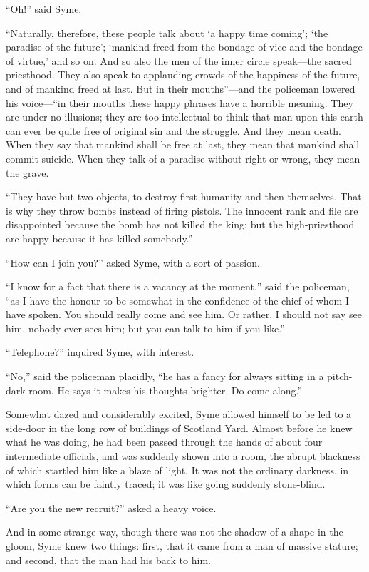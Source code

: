 “Oh!” said Syme.

“Naturally, therefore, these people talk about ‘a happy time coming’; ‘the paradise of the future’; ‘mankind freed from the bondage of vice and the bondage of virtue,’ and so on. And so also the men of the inner circle speak⁠—the sacred priesthood. They also speak to applauding crowds of the happiness of the future, and of mankind freed at last. But in their mouths”⁠—and the policeman lowered his voice⁠—“in their mouths these happy phrases have a horrible meaning. They are under no illusions; they are too intellectual to think that man upon this earth can ever be quite free of original sin and the struggle. And they mean death. When they say that mankind shall be free at last, they mean that mankind shall commit suicide. When they talk of a paradise without right or wrong, they mean the grave.

“They have but two objects, to destroy first humanity and then themselves. That is why they throw bombs instead of firing pistols. The innocent rank and file are disappointed because the bomb has not killed the king; but the high-priesthood are happy because it has killed somebody.”

“How can I join you?” asked Syme, with a sort of passion.

“I know for a fact that there is a vacancy at the moment,” said the policeman, “as I have the honour to be somewhat in the confidence of the chief of whom I have spoken. You should really come and see him. Or rather, I should not say see him, nobody ever sees him; but you can talk to him if you like.”

“Telephone?” inquired Syme, with interest.

“No,” said the policeman placidly, “he has a fancy for always sitting in a pitch-dark room. He says it makes his thoughts brighter. Do come along.”

Somewhat dazed and considerably excited, Syme allowed himself to be led to a side-door in the long row of buildings of Scotland Yard. Almost before he knew what he was doing, he had been passed through the hands of about four intermediate officials, and was suddenly shown into a room, the abrupt blackness of which startled him like a blaze of light. It was not the ordinary darkness, in which forms can be faintly traced; it was like going suddenly stone-blind.

“Are you the new recruit?” asked a heavy voice.

And in some strange way, though there was not the shadow of a shape in the gloom, Syme knew two things: first, that it came from a man of massive stature; and second, that the man had his back to him.


